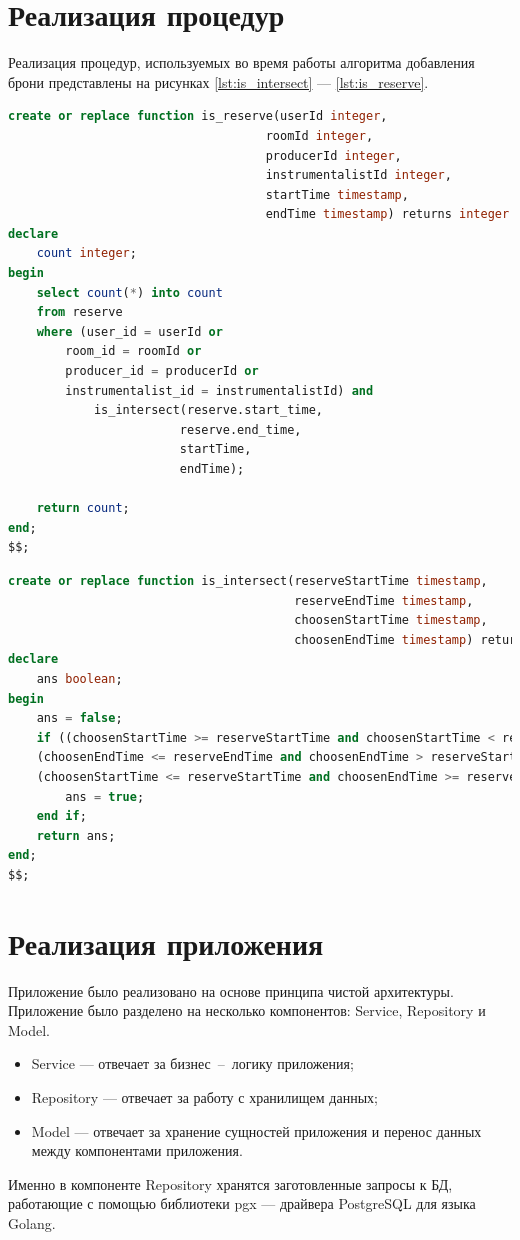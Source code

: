 \section{Реализация процедур}
Реализация процедур, используемых во время работы алгоритма добавления брони представлены на рисунках \ref{lst:is_intersect} --- \ref{lst:is_reserve}.
\newline
\begin{lstlisting}[language=sql, label=lst:is_reserve]
create or replace function is_reserve(userId integer,
									roomId integer,
									producerId integer,
									instrumentalistId integer,
									startTime timestamp,
									endTime timestamp) returns integer language plpgsql as $$
declare
	count integer;
begin
	select count(*) into count
	from reserve
	where (user_id = userId or
		room_id = roomId or
		producer_id = producerId or
		instrumentalist_id = instrumentalistId) and 
			is_intersect(reserve.start_time,
						reserve.end_time,
						startTime,
						endTime);

	return count;
end;
$$;
\end{lstlisting}
\newpage

\begin{lstlisting}[language=sql, label=lst:is_intersect]
create or replace function is_intersect(reserveStartTime timestamp, 
										reserveEndTime timestamp,
										choosenStartTime timestamp,
										choosenEndTime timestamp) returns boolean language plpgsql as $$
declare
	ans boolean;
begin
	ans = false;
	if ((choosenStartTime >= reserveStartTime and choosenStartTime < reserveEndTime) or
	(choosenEndTime <= reserveEndTime and choosenEndTime > reserveStartTime) or
	(choosenStartTime <= reserveStartTime and choosenEndTime >= reserveEndTime)) then
		ans = true;
	end if;
	return ans;
end;
$$;
\end{lstlisting}

\section{Реализация приложения}

Приложение было реализовано на основе принципа чистой архитектуры.
Приложение было разделено на несколько компонентов: Service, Repository и Model.
\begin{itemize}
	\item Service --- отвечает за бизнес~--~логику приложения;
	\item Repository --- отвечает за работу с хранилищем данных;
	\item Model --- отвечает за хранение сущностей приложения и перенос данных между компонентами приложения.
\end{itemize}
Именно в компоненте Repository хранятся заготовленные запросы к БД, работающие с помощью библиотеки pgx --- драйвера PostgreSQL для языка Golang. 



